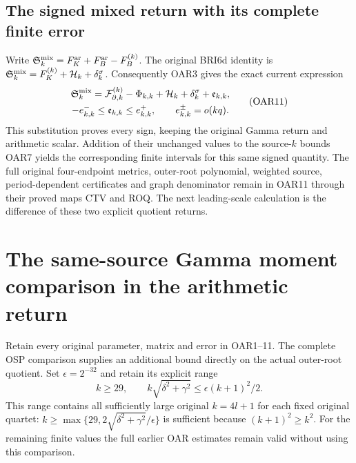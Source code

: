 \documentclass[11pt,a4paper]{article}
\begin{document}
\subsection{The signed mixed return with its complete finite error}
Write
$\mathfrak S_k^{\rm mix}=F_K^{\rm ar}+F_B^{\rm ar}-F_B^{(k)}$.
The original BRI6d identity is
$\mathfrak S_k^{\rm mix}=F_K^{(k)}+\mathcal H_k+\delta_k^\sigma$.
Consequently OAR3 gives the exact current expression
\[
 \begin{gathered}
 \mathfrak S_k^{\rm mix}=\mathcal F_{\partial,k}^{(k)}-\Phi_{k,k}
              +\mathcal H_k+\delta_k^\sigma+\mathfrak e_{k,k},\\
 -e_{k,k}^-\le\mathfrak e_{k,k}\le e_{k,k}^+,
 \qquad e_{k,k}^\pm=o(kq).
 \end{gathered}\tag{OAR11}
\]
This substitution proves every sign, keeping the original Gamma
return and arithmetic scalar. Addition of their unchanged values
to the source-$k$ bounds OAR7 yields the corresponding finite
intervals for this same signed quantity. The full original
four-endpoint metrics, outer-root polynomial, weighted source,
period-dependent certificates and graph denominator remain in
OAR11 through their proved maps CTV and ROQ. The next leading-scale
calculation is the difference of these two explicit quotient returns.


\clearpage
\section{The same-source Gamma moment comparison in the arithmetic return}
\label{sec:PMR}
Retain every original parameter, matrix and error in OAR1--11.
The complete OSP comparison supplies an additional bound directly
on the actual outer-root quotient. Set $\epsilon=2^{-32}$ and
retain its explicit range
\[
 k\ge29,\qquad k\sqrt{\delta^2+\gamma^2}
           \le\epsilon(k+1)^2/2.
 \tag{PMR1}
\]
This range contains all sufficiently large original $k=4l+1$ for
each fixed original quartet: $k\ge\max\{29,
2\sqrt{\delta^2+\gamma^2}/\epsilon\}$ is sufficient because
$(k+1)^2\ge k^2$. For the remaining finite values the full earlier
OAR estimates remain valid without using this comparison.
\end{document}
